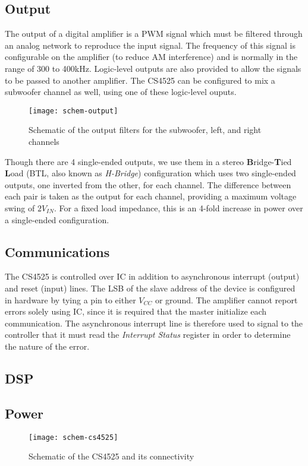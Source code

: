 \subsection{Output}
The output of a digital amplifier is a PWM signal which must be filtered through an analog network to reproduce the input signal. The frequency of this signal is configurable on the amplifier (to reduce AM interference) and is normally in the range of 300 to 400kHz. Logic-level outputs are also provided to allow the signals to be passed to another amplifier. The CS4525 can be configured to mix a subwoofer channel as well, using one of these logic-level ouputs.
\begin{figure}[H]
	\centering
	\texttt{[image: schem-output]}
	\caption[Schematic -- Amplifier Output Filters]%
	{Schematic of the output filters for the subwoofer, left, and right channels}
\end{figure}
Though there are 4 single-ended outputs, we use them in a stereo \textbf{B}ridge-\textbf{T}ied \textbf{L}oad (BTL, also known as \textit{H-Bridge}) configuration which uses two single-ended outputs, one inverted from the other, for each channel. The difference between each pair is taken as the output for each channel, providing a maximum voltage swing of $2V_{IN}$. For a fixed load impedance, this is an 4-fold increase in power over a single-ended configuration.
\subsection{Communications}
The CS4525 is controlled over IC in addition to asynchronous interrupt (output) and reset (input) lines. The LSB of the slave address of the device is configured in hardware by tying a pin to either $V_{CC}$ or ground. The amplifier cannot report errors solely using IC, since it is required that the master initialize each communication. The asynchronous interrupt line is therefore used to signal to the controller that it must read the \textit{Interrupt Status} register in order to determine the nature of the error.
\subsection{DSP}
\subsection{Power}
\begin{figure}[H]
	\centering
	\texttt{[image: schem-cs4525]}
	\caption[Schematic -- CS4525 Amplifier]%
	{Schematic of the CS4525 and its connectivity}
\end{figure}


